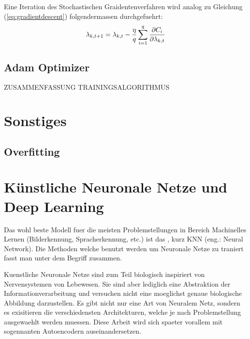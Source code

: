 Eine Iteration des Stochastischen Graidentenverfahren wird analog zu Gleichung (\ref{eq:gradientdescent}) folgendermassen durchgefuehrt:
\begin{equation}\label{eq:sgd}
  \lambda_{k,t+1} = \lambda_{k,t} - \frac{\eta}{q} \sum_{i=1}^{q} \frac{\partial C_i}{\partial \lambda_{k,t}}
\end{equation}


\subsection{Adam Optimizer}
ZUSAMMENFASSUNG TRAININGSALGORITHMUS

\section{Sonstiges}

\subsection{Overfitting}

\pagebreak
\section{Künstliche Neuronale Netze und Deep Learning}
Das wohl beste Modell fuer die meisten Problemstellungen in Bereich Machinelles Lernen (Bilderkennung, Spracherkennung, etc.) ist das , kurz KNN (eng.: Neural Network).
Die Methoden welche benutzt werden um Neuronale Netze zu traniert fasst man unter dem Begriff  zusammen.

Kuenstliche Neuronale Netze sind zum Teil biologisch inspiriert von Nervensystemen von Lebewesen. Sie sind aber lediglich eine Abstraktion der Informationverarbeitung und versuchen nicht eine moeglichst genaue biologische Abbildung darzustellen.
Es gibt nicht nur eine Art von Neuralem Netz, sondern es exisitieren die
verschiedensten Architekturen, welche je nach Problemstellung ausgewaehlt werden
muessen. Diese Arbeit wird sich spaeter vorallem mit sogennanten Autoencodern auseinandersetzen.



